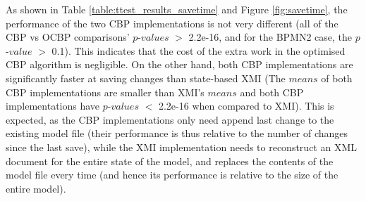\documentclass{llncs}
\begin{document}
{    As shown in Table \ref{table:ttest_results_savetime} and Figure \ref{fig:savetime}, the performance of the two CBP implementations is not very different (all of the CBP vs OCBP comparisons' $p$-$values$ $>$ 2.2e-16, and for the BPMN2 case, the $p$-$value$ $>$ 0.1). This indicates that the cost of the extra work in the optimised CBP algorithm is negligible. On the other hand, both CBP implementations are significantly faster at saving changes than state-based XMI (The $means$ of both CBP implementations are smaller than XMI's $means$ and both CBP implementations have $p$-$values$ $<$ 2.2e-16 when compared to XMI). This is expected, as the CBP implementations only need append last change to the existing model file (their performance is thus relative to the number of changes since the last save), while the XMI implementation needs to reconstruct an XML document for the entire state of the model, and replaces the contents of the model file every time (and hence its performance is relative to the size of the entire model). 
    
}
\end{document}
